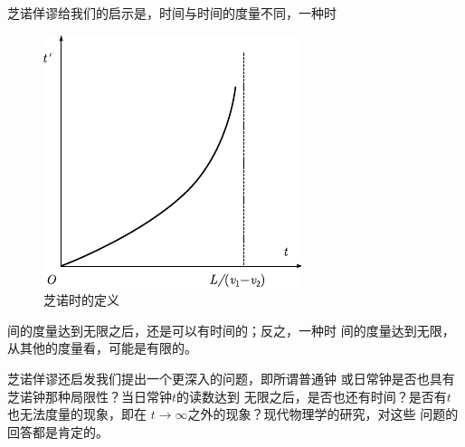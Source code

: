 芝诺佯谬给我们的启示是，时间与时间的度量不同，一种时\clearpage
\begin{figure}
    \includegraphics{figure/fig01.03}
    \caption{芝诺时的定义}
    \label{fig:01.03}
\end{figure}
\noindent 间的度量达到无限之后，还是可以有时间的；反之，一种时
间的度量达到无限，从其他的度量看，可能是有限的。

芝诺佯谬还启发我们提出一个更深入的问题，即所谓普通钟
或日常钟是否也具有芝诺钟那种局限性？当日常钟$t$的读数达到
无限之后，是否也还有时间？是否有$t$也无法度量的现象，即在
$t\rightarrow\infty$之外的现象？现代物理学的研究，对这些
问题的回答都是肯定的。
